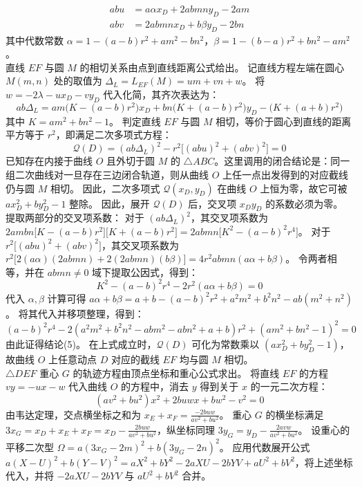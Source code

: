 \begin{solution}
\begin{align*}
ab u &= a \alpha x_D + 2abmn y_D - 2am \\
ab v &= 2abmn x_D + b \beta y_D - 2bn
\end{align*}
其中代数常数 $\alpha = 1 - (a-b)r^2 + am^2 - bn^2$，$\beta = 1 - (b-a)r^2 + bn^2 - am^2$。\\
直线 $EF$ 与圆 $M$ 的相切关系由点到直线距离公式给出。
记直线方程左端在圆心 $M(m,n)$ 处的取值为 $\Delta_L = L_{EF}(M) = um + vn + w$。
将 $w = -2\lambda - u x_D - v y_D$ 代入化简，其齐次表达为：
$$ ab \Delta_L = a m \big(K - (a-b)r^2\big) x_D + b n \big(K + (a-b)r^2\big) y_D - \big(K + (a+b)r^2\big) $$
其中 $K = am^2 + bn^2 - 1$。
判定直线 $EF$ 与圆 $M$ 相切，等价于圆心到直线的距离平方等于 $r^2$，即满足二次多项式方程：
$$ \mathcal{Q}(D) = (ab \Delta_L)^2 - r^2 \big[ (ab u)^2 + (ab v)^2 \big] = 0 $$
已知存在内接于曲线 $O$ 且外切于圆 $M$ 的 $\triangle ABC$。这里调用的闭合结论是：同一组二次曲线对一旦存在三边闭合轨道，则从曲线 $O$ 上任一点出发得到的对应截线仍与圆 $M$ 相切。
因此，二次多项式 $\mathcal{Q}(x_D, y_D)$ 在曲线 $O$ 上恒为零，故它可被 $a x_D^2 + b y_D^2 - 1$ 整除。
因此，展开 $\mathcal{Q}(D)$ 后，交叉项 $x_D y_D$ 的系数必须为零。
提取两部分的交叉项系数：
对于 $(ab \Delta_L)^2$，其交叉项系数为 $2 a m b n \big[ K - (a-b)r^2 \big] \big[ K + (a-b)r^2 \big] = 2abmn \big[ K^2 - (a-b)^2 r^4 \big]$。
对于 $r^2 \big[ (ab u)^2 + (ab v)^2 \big]$，其交叉项系数为 $r^2 \big[ 2(a\alpha)(2abmn) + 2(2abmn)(b\beta) \big] = 4r^2 abmn (a\alpha + b\beta)$。
令两者相等，并在 $abmn \neq 0$ 域下提取公因式，得到：
$$ K^2 - (a-b)^2 r^4 - 2r^2 (a\alpha + b\beta) = 0 $$
代入 $\alpha, \beta$ 计算可得 $a\alpha + b\beta = a + b - (a-b)^2 r^2 + a^2 m^2 + b^2 n^2 - ab(m^2 + n^2)$。
将其代入并移项整理，得到：
$$ (a - b)^2 r^4 - 2(a^2 m^2 + b^2 n^2 - abm^2 - abn^2 + a + b) r^2 + (am^2 + bn^2 - 1)^2 = 0 $$
由此证得结论(5)。
在上式成立时，$\mathcal{Q}(D)$ 可化为常数乘以 $(a x_D^2 + b y_D^2 - 1)$，故曲线 $O$ 上任意动点 $D$ 对应的截线 $EF$ 均与圆 $M$ 相切。\\
$\triangle DEF$ 重心 $G$ 的轨迹方程由顶点坐标和重心公式求出。
将直线 $EF$ 的方程 $vy = -ux - w$ 代入曲线 $O$ 的方程中，消去 $y$ 得到关于 $x$ 的一元二次方程：
$$ (av^2 + bu^2)x^2 + 2buwx + bw^2 - v^2 = 0 $$
由韦达定理，交点横坐标之和为 $x_E + x_F = \frac{-2buw}{av^2 + bu^2}$。
重心 $G$ 的横坐标满足 $3x_G = x_D + x_E + x_F = x_D - \frac{2buw}{av^2 + bu^2}$，纵坐标同理 $3y_G = y_D - \frac{2avw}{av^2 + bu^2}$。
设重心的平移二次型 $\Omega = a(3x_G - 2m)^2 + b(3y_G - 2n)^2$。
应用代数展开公式 $a(X-U)^2 + b(Y-V)^2 = aX^2 + bY^2 - 2aXU - 2bYV + aU^2 + bV^2$，将上述坐标代入，并将 $-2aXU - 2bYV$ 与 $aU^2 + bV^2$ 合并。

\end{solution}
